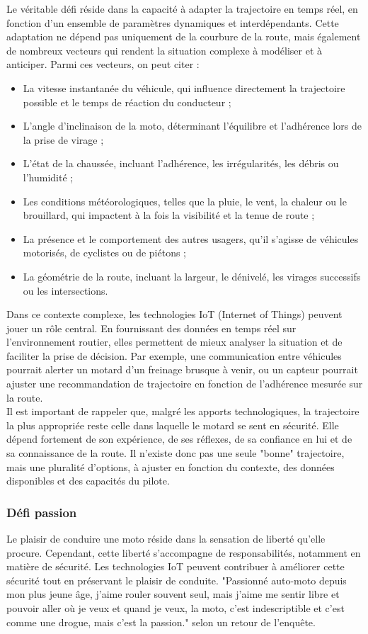 Le véritable défi réside dans la capacité à adapter la trajectoire en temps réel, en fonction d’un ensemble de paramètres dynamiques et interdépendants. Cette adaptation ne dépend pas uniquement de la courbure de la route, mais également de nombreux vecteurs qui rendent la situation complexe à modéliser et à anticiper. Parmi ces vecteurs, on peut citer :\\
\begin{itemize}
\item La vitesse instantanée du véhicule, qui influence directement la trajectoire possible et le temps de réaction du conducteur ;
\item L’angle d’inclinaison de la moto, déterminant l’équilibre et l’adhérence lors de la prise de virage ;
\item L’état de la chaussée, incluant l’adhérence, les irrégularités, les débris ou l’humidité ;
\item Les conditions météorologiques, telles que la pluie, le vent, la chaleur ou le brouillard, qui impactent à la fois la visibilité et la tenue de route ;
\item La présence et le comportement des autres usagers, qu’il s’agisse de véhicules motorisés, de cyclistes ou de piétons ;
\item La géométrie de la route, incluant la largeur, le dénivelé, les virages successifs ou les intersections.
\end{itemize}
Dans ce contexte complexe, les technologies IoT (Internet of Things) peuvent jouer un rôle central. En fournissant des données en temps réel sur l’environnement routier, elles permettent de mieux analyser la situation et de faciliter la prise de décision. Par exemple, une communication entre véhicules pourrait alerter un motard d’un freinage brusque à venir, ou un capteur pourrait ajuster une recommandation de trajectoire en fonction de l’adhérence mesurée sur la route.\\
Il est important de rappeler que, malgré les apports technologiques, la trajectoire la plus appropriée reste celle dans laquelle le motard se sent en sécurité. Elle dépend fortement de son expérience, de ses réflexes, de sa confiance en lui et de sa connaissance de la route. Il n’existe donc pas une seule "bonne" trajectoire, mais une pluralité d’options, à ajuster en fonction du contexte, des données disponibles et des capacités du pilote.

\subsubsection{Défi passion}
\vspace{0.5cm}
Le plaisir de conduire une moto réside dans la sensation de liberté qu'elle procure. Cependant, cette liberté s'accompagne de responsabilités, notamment en matière de sécurité. Les technologies IoT peuvent contribuer à améliorer cette sécurité tout en préservant le plaisir de conduite. "Passionné auto-moto depuis mon plus jeune âge, j'aime rouler souvent seul, mais j'aime me sentir libre et pouvoir aller où je veux et quand je veux, la moto, c'est indescriptible et c'est comme une drogue, mais c'est la passion." selon un retour de l'enquête.

